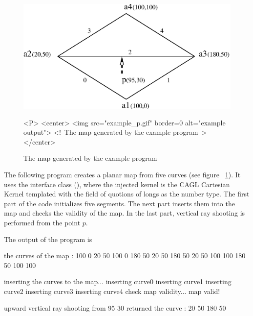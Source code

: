 \begin{figure}[h]
\begin{ccTexOnly}
    \centerline{
      \includegraphics{example_p.ps}
    }
\end{ccTexOnly}

\caption{The map generated by the example program
\label{PM_sec:example_pic}}

\begin{ccHtmlOnly}
    <P>
    <center>
        <img src="example_p.gif"  border=0 alt="example output">
        <!--The map generated by the example program-->
    </center>
\end{ccHtmlOnly}
\end{figure}

The following program creates a planar map from five curves (see figure
~\ref{PM_sec:example_pic}). It uses the interface class
(), where the injected kernel is the
CAGL Cartesian Kernel templated with the field of quotions of longs as the
number type.
The first part of the code initializes five segments. The next part inserts them
into the map and checks the validity of the map. In the last part, vertical ray
shooting is performed from the point $p$.


The output of the program is

\begin{ccExampleCode}
the curves of the map :
100 0 20 50
100 0 180 50
20 50 180 50
20 50 100 100
180 50 100 100

inserting the curves to the map...
inserting curve0
inserting curve1
inserting curve2
inserting curve3
inserting curve4
check map validity... map valid!

upward vertical ray shooting from 95 30
returned the curve : 20 50 180 50

\end{ccExampleCode}

